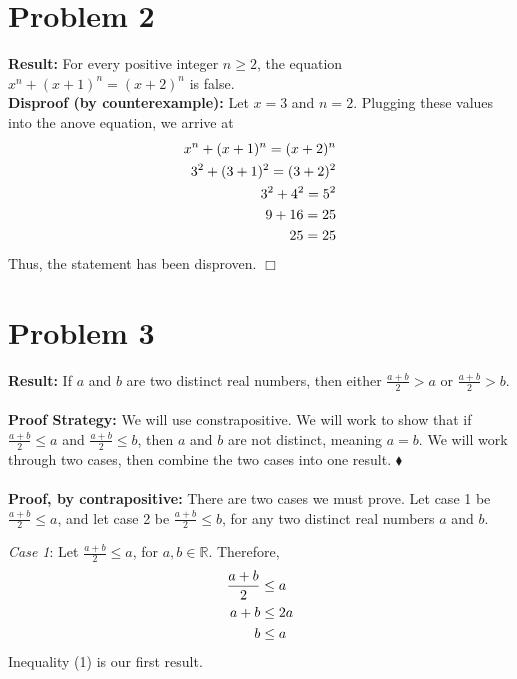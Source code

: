 \documentclass[11pt]{article}
\begin{document}
\section*{Problem 2}

    \textbf{Result:} For every positive integer $n \geq 2$, the equation $x^n + (x+1)^n = (x+2)^n$ is false. \\
    \textbf{Disproof (by counterexample):} Let $x = 3$ and $n = 2$. Plugging these values into the anove equation, we arrive at
    \begin{align}
        x^n + (x+1)^n = (x+2)^n \notag\\
        3^2 + (3+1)^2 = (3+2)^2 \notag\\
        3^2 + 4^2 = 5^2 \notag\\
        9 + 16 = 25 \notag\\
        25 = 25 \notag
    \end{align}
    Thus, the statement has been disproven. \hfill $\Box$

\newpage

\section*{Problem 3}

    \textbf{Result:} If $a$ and $b$ are two distinct real numbers, then either $\frac{a+b}{2} > a$ or $\frac{a+b}{2}>b$.\\
    \\
    \textbf{Proof Strategy:} We will use constrapositive. We will work to show that if $\frac{a+b}{2} \leq a$ and $\frac{a+b}{2} \leq b$, then $a$ and $b$ are not distinct, meaning $a=b$. We will work through two cases, then combine the two cases into one result. \hfill $\blacklozenge$\\
    \\
    \textbf{Proof, by contrapositive:} There are two cases we must prove. Let case 1 be $\frac{a+b}{2} \leq a$, and let case 2 be $\frac{a+b}{2} \leq b$, for any two distinct real numbers $a$ and $b$.

    \textit{Case 1}: Let $\frac{a+b}{2} \leq a$, for $a, b \in \mathbb{R}$. Therefore, 
    \begin{align}
        \frac{a+b}{2} & \le a \notag \\
        a+b & \le 2a \notag \\
        b & \le a \label{ineq1}
    \end{align}
    Inequality (1) is our first result.
\end{document}

